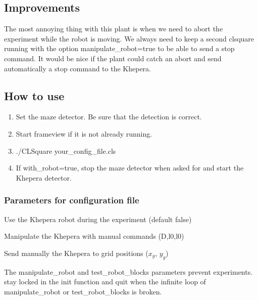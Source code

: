 \subsection{Improvements}
\label{sec:mkp:improvements}

The most annoying thing with this plant is when we need to abort 
the experiment while the robot is moving. We always need to keep a 
second clsquare running with the option manipulate\_robot=true to be 
able to send a stop command. It would be nice if the plant could catch 
an abort and send automatically a stop command to the Khepera.

\subsection{How to use}
\label{sec:mkp:howto}
    \begin{enumerate}
        \item Set the maze detector. Be sure that the detection is correct.
        \item Start frameview if it is not already running.
        \item ./CLSquare your\_config\_file.cls
        \item If with\_robot=true, stop the maze detector when asked 
            for and start the Khepera detector.
    \end{enumerate}

\subsubsection{Parameters for configuration file}
\label{sec:mkp:params}
    \begin{description} \itemindent=-15pt
        \item[with\_robot] Use the Khepera robot during the experiment 
            (default false)
        \item[manipulate\_robot] Manipulate the Khepera with manual 
            commands (D,l0,l0)
        \item[test\_robot\_blocks] Send manually the Khepera to grid 
            positions ($x_g$, $y_g$)
    \end{description}

The manipulate\_robot and test\_robot\_blocks parameters prevent 
experiments. \clsquare{} stay locked in the init function and quit when 
the infinite loop of manipulate\_robot or test\_robot\_blocks is broken. 
